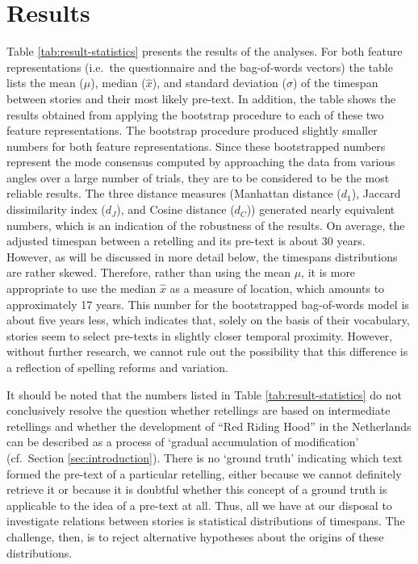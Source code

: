 \section{Results}\label{sec:results}

Table \ref{tab:result-statistics} presents the results of the analyses. For both feature representations (i.e.\ the questionnaire and the bag-of-words vectors) the table lists the mean ($\mu$), median ($\hat{x}$), and standard deviation ($\sigma$) of the timespan between stories and their most likely pre-text. In addition, the table shows the results obtained from applying the bootstrap procedure to each of these two feature representations. The bootstrap procedure produced slightly smaller numbers for both feature representations. Since these bootstrapped numbers represent the mode consensus computed by approaching the data from various angles over a large number of trials, they are to be considered to be the most reliable results. The three distance measures (Manhattan distance ($d_1$), Jaccard dissimilarity index ($d_J$), and Cosine distance ($d_C$)) generated nearly equivalent numbers, which is an indication of the robustness of the results. On average, the adjusted timespan between a retelling and its pre-text is about 30 years. However, as will be discussed in more detail below, the timespans distributions are rather skewed. Therefore, rather than using the mean $\mu$, it is more appropriate to use the median $\hat{x}$ as a measure of location, which amounts to approximately 17 years. This number for the bootstrapped bag-of-words model is about five years less, which indicates that, solely on the basis of their vocabulary, stories seem to select pre-texts in slightly closer temporal proximity. However, without further research, we cannot rule out the possibility that this difference is a reflection of spelling reforms and variation. 

It should be noted that the numbers listed in Table \ref{tab:result-statistics} do not conclusively resolve the question whether retellings are based on intermediate retellings and whether the development of ``Red Riding Hood'' in the Netherlands can be described as a process of `gradual accumulation of modification' (cf.\ Section \ref{sec:introduction}). There is no `ground truth' indicating which text formed the pre-text of a particular retelling, either because we cannot definitely retrieve it or because it is doubtful whether this concept of a ground truth is applicable to the idea of a pre-text at all. Thus, all we have at our disposal to investigate relations between stories is statistical distributions of timespans. The challenge, then, is to reject alternative hypotheses about the origins of these distributions.


